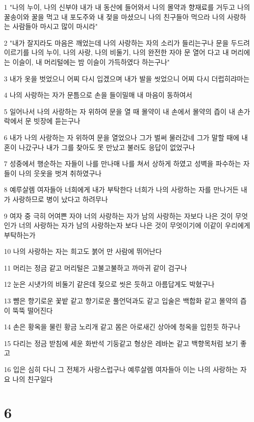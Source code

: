 \par 1 "나의 누이, 나의 신부야 내가 내 동산에 들어와서 나의 몰약과 향재료를 거두고 나의 꿀송이와 꿀을 먹고 내 포도주와 내 젖을 마셨으니 나의 친구들아 먹으라 나의 사랑하는 사람들아 마시고 많이 마시라"
\par 2 "내가 잘지라도 마음은 깨었는데 나의 사랑하는 자의 소리가 들리는구나 문을 두드려 이르기를 나의 누이, 나의 사랑, 나의 비둘기, 나의 완전한 자야 문 열어 다고 내 머리에는 이슬이, 내 머리털에는 밤 이슬이 가득하였다 하는구나"
\par 3 내가 옷을 벗었으니 어찌 다시 입겠으며 내가 발을 씻었으니 어찌 다시 더럽히랴마는
\par 4 나의 사랑하는 자가 문틈으로 손을 들이밀매 내 마음이 동하여서
\par 5 일어나서 나의 사랑하는 자 위하여 문을 열 때 몰약이 내 손에서 몰약의 즙이 내 손가락에서 문 빗장에 듣는구나
\par 6 내가 나의 사랑하는 자 위하여 문을 열었으나 그가 벌써 물러갔네 그가 말할 때에 내 혼이 나갔구나 내가 그를 찾아도 못 만났고 불러도 응답이 없었구나
\par 7 성중에서 행순하는 자들이 나를 만나매 나를 쳐서 상하게 하였고 성벽을 파수하는 자들이 나의 웃옷을 벗겨 취하였구나
\par 8 예루살렘 여자들아 너희에게 내가 부탁한다 너희가 나의 사랑하는 자를 만나거든 내가 사랑하므로 병이 났다고 하려무나
\par 9 여자 중 극히 어여쁜 자야 너의 사랑하는 자가 남의 사랑하는 자보다 나은 것이 무엇인가 너의 사랑하는 자가 남의 사랑하는자 보다 나은 것이 무엇이기에 이같이 우리에게 부탁하는가
\par 10 나의 사랑하는 자는 희고도 붉어 만 사람에 뛰어난다
\par 11 머리는 정금 같고 머리털은 고불고불하고 까마귀 같이 검구나
\par 12 눈은 시냇가의 비둘기 같은데 젖으로 씻은 듯하고 아름답게도 박혔구나
\par 13 뺨은 향기로운 꽃밭 같고 향기로운 풀언덕과도 같고 입술은 백합화 같고 몰약의 즙이 뚝뚝 떨어진다
\par 14 손은 황옥을 물린 황금 노리개 같고 몸은 아로새긴 상아에 청옥을 입힌듯 하구나
\par 15 다리는 정금 받침에 세운 화반석 기둥같고 형상은 레바논 같고 백향목처럼 보기 좋고
\par 16 입은 심히 다니 그 전체가 사랑스럽구나 예루살렘 여자들아 이는 나의 사랑하는 자요 나의 친구일다

\chapter{6}

